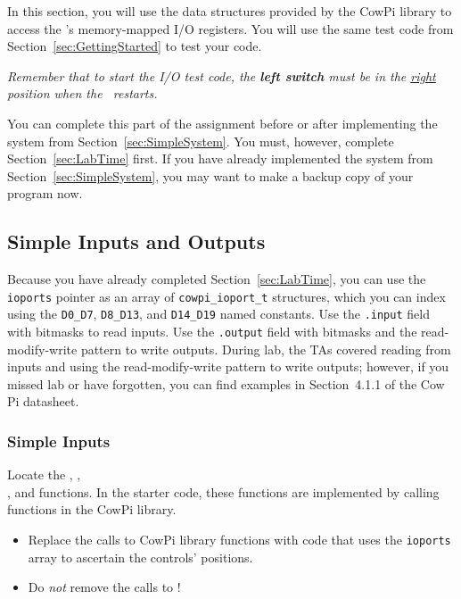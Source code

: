 In this section, you will use the data structures provided by the CowPi library to access the \developmentboard's memory-mapped I/O registers.
You will use the same test code from Section~\ref{sec:GettingStarted} to test your code.

\textit{Remember that to start the I/O test code, the \textbf{left switch} must be in the \underline{right} position when the \developmentboard\ restarts.}

You can complete this part of the assignment before or after implementing the system from Section~\ref{sec:SimpleSystem}.
You must, however, complete Section~\ref{sec:LabTime} first.
If you have already implemented the system from Section~\ref{sec:SimpleSystem}, you may want to make a backup copy of your program now.


\subsection{Simple Inputs and Outputs} \label{subsec:simpleIO}

Because you have already completed Section~\ref{sec:LabTime}, you can use the \lstinline{ioports} pointer as an array of \lstinline{cowpi_ioport_t} structures, which you can index using the \lstinline{D0_D7}, \lstinline{D8_D13}, and \lstinline{D14_D19} named constants.
Use the \lstinline{.input} field with bitmasks to read inputs.
Use the \lstinline{.output} field with bitmasks and the read-modify-write pattern to write outputs.
During lab, the TAs covered reading from inputs and using the read-modify-write pattern to write outputs;
however, if you missed lab or have forgotten, you can find examples in Section~4.1.1 of the Cow Pi datasheet.

\subsubsection{Simple Inputs}

Locate the , , \\ , and   functions.
In the starter code, these functions are implemented by calling functions in the CowPi library.

\begin{itemize}
    \item Replace the calls to CowPi library functions with code that uses the \lstinline{ioports} array to ascertain the controls' positions.
    \item Do \textit{not} remove the calls to !
\end{itemize}

